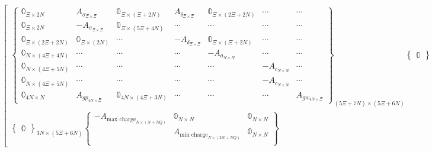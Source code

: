 \documentclass[conference]{IEEEtran}
\begin{document}
\begin{equation}
\begin{array}{c}
\begin{bmatrix}
\begin{Bmatrix}
            \mathbb{0}_{\Xi \times 2N}          & A_{\sigma_{\Xi \times \Xi}}         & \mathbb{0}_{\Xi \times (\Xi + 2N)}  & A_{\delta_{\Xi \times \Xi}}  & \mathbb{0}_{\Xi \times (2\Xi + 2N)} & \cdots              & \cdots \\
            \mathbb{0}_{\Xi \times 2N}          & -A_{\sigma_{\Xi \times \Xi}}        & \mathbb{0}_{\Xi \times (5\Xi + 4N)} & \cdots                       & \cdots                            & \cdots              & \cdots \\
            \mathbb{0}_{\Xi \times (2\Xi + 2N)} & \mathbb{0}_{\Xi \times (2N)}  & \cdots                              & -A_{\delta_{\Xi \times \Xi}} & \mathbb{0}_{\Xi \times (\Xi + 2N)}        & \cdots              & \cdots \\
            \mathbb{0}_{N \times (4\Xi + 4N)}   & \cdots                              & \cdots                              & \cdots                       & -A_{a_{N \times N}}               & \cdots              & \cdots \\
            \mathbb{0}_{N \times (4\Xi + 5N)}   & \cdots                              & \cdots                              & \cdots                       & \cdots                            & -A_{c_{N \times N}} & \cdots \\
            \mathbb{0}_{N \times (4\Xi + 5N)}   & \cdots                              & \cdots                              & \cdots                       & \cdots                            & -A_{c_{N \times N}} & \cdots \\
            \mathbb{0}_{4N \times N}            & A_{gp_{4N \times \Xi}}              & \mathbb{0}_{4N \times (4\Xi + 3N)}  & \cdots                       & \cdots                            & \cdots              & A_{gw_{4N \times \Xi}}
        \end{Bmatrix}_{(5\Xi + 7N) \times (5\Xi + 6N)}
        \begin{Bmatrix}
            \mathbb{0}
        \end{Bmatrix}_{(5 \Xi + 6N) \times (3N + NQ)} \\
        \begin{Bmatrix}
            \mathbb{0}
        \end{Bmatrix}_{3N \times (5\Xi + 6N)}
        \begin{Bmatrix}
            -A_{\textrm{max charge}_{N \times (N+NQ)}} & \mathbb{0}_{N \times N}                    & \mathbb{0}_{N \times N}                \\
                                  & A_{\textrm{min charge}_{N \times (2N+NQ)}} & \mathbb{0}_{N \times N}                \\

\end{Bmatrix}
\end{bmatrix}
\end{array}
\end{equation}
\end{document}

